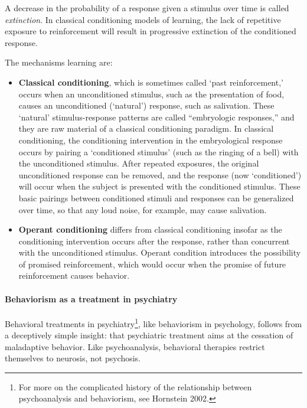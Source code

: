 \begin{refsection}
A decrease in the probability of a response given a stimulus over time is called \emph{extinction}. In classical conditioning models of learning, the lack of repetitive exposure to reinforcement will result in progressive extinction of the conditioned response.

The mechanisms learning are:

\begin{itemize}
\item \textbf{Classical conditioning}, which is sometimes called `past reinforcement,' occurs when an unconditioned stimulus, such as the presentation of food, causes an unconditioned (`natural') response, such as salivation. These `natural' stimulus-response patterns are called ``embryologic responses,'' and they are raw material of a classical conditioning paradigm. In classical conditioning, the conditioning intervention in the embryological response occurs by pairing a `conditioned stimulus' (such as the ringing of a bell) with the unconditioned stimulus. After repeated exposures, the original unconditioned response can be removed, and the response (now `conditioned') will occur when the subject is presented with the conditioned stimulus. These basic pairings between conditioned stimuli and responses can be generalized over time, so that any loud noise, for example, may cause salivation. 

\item \textbf{Operant conditioning} differs from classical conditioning insofar as the conditioning intervention occurs after the response, rather than concurrent with the unconditioned stimulus. Operant condition introduces the possibility of promised reinforcement, which would occur when the promise of future reinforcement causes behavior.

\end{itemize}

\paragraph{Behaviorism as a treatment in psychiatry}
\label{behaviorismasatreatmentinpsychiatry}

Behavioral treatments in psychiatry\footnote{For more on the complicated history of the relationship between psychoanalysis and behaviorism, see Hornstein 2002.}, like behaviorism in psychology, follows from a deceptively simple insight: that psychiatric treatment aims at the cessation of maladaptive behavior. Like psychoanalysis, behavioral therapies restrict themselves to neurosis, not psychosis.


\end{refsection}
